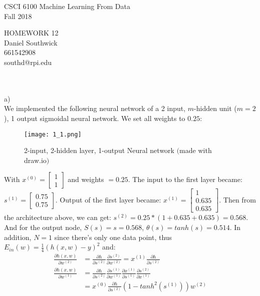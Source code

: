 \documentclass[12pt]{article}
\newcommand{\D}{\displaystyle}
\begin{document}
\begin{center}
CSCI 6100 Machine Learning From Data\\
Fall 2018\\
\end{center}
\begin{center}
HOMEWORK 12\\
Daniel Southwick\\
661542908\\
southd@rpi.edu
\end{center}
\vspace{.1in}

 \\\\
a)\\
\indent We implemented the following neural network of a 2 input, $m$-hidden unit ($m=2$), 1 output sigmoidal neural network. We set all weights to $0.25$:
\begin{figure}[H]
  \centering
  \texttt{[image: 1\_1.png]}
  \caption{2-input, 2-hidden layer, 1-output Neural network $($made with draw.io$)$}
  \label{fig:1}
\end{figure}
\indent With $x^{(0)}= \begin{bmatrix} 1\\ 1 \end{bmatrix} $ and weights $= 0.25$. The input to the first layer became: $s^{(1)}= \begin{bmatrix} 0.75\\ 0.75 \end{bmatrix} $. Output of the first layer became:  $x^{(1)}= \begin{bmatrix} 1\\ 0.635\\ 0.635 \end{bmatrix} $. Then from the architecture above, we can get: $s^{(2)}= 0.25*(1+0.635+0.635) = 0.568$. And for the output node, $S(s) = s = 0.568$, $\theta(s) = tanh(s) = 0.514$. In addition, $N = 1$ since there's only one data point, thus $\D E_{in}(w) = \frac{1}{4}(h(x,w)-y)^2$ and:
\begin{align*}\D
\frac{\partial h(x,w)}{\partial w^{(2)}} &= \frac{\partial h}{\partial s^{(2)}} \frac{\partial s^{(2)}}{\partial w^{(2)}} = x^{(1)} \frac{\partial h}{\partial s^{(2)}}  \\
\frac{\partial h(x,w)}{\partial w^{(1)}} &= \frac{\partial h}{\partial s^{(2)}} \frac{\partial s^{(1)}}{\partial w^{(1)}} \frac{\partial x^{(1)}}{\partial s^{(1)}} \frac{\partial s^{(2)}}{\partial x^{(1)}} \\
&= x^{(0)}\frac{\partial h}{\partial s^{(2)}} (1 - tanh^2(s^{(1)}))w^{(2)}
\end{align*}
\end{document}
